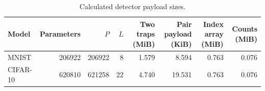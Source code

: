 \begin{table}[t]\centering\footnotesize
\caption{Calculated detector payload sizes.}\label{tab:payload}
\begin{tabular}{lrrrrrrr}\toprule
Model & Parameters & $P$ & $L$ & Two traps (MiB) & Pair payload (KiB) & Index array (MiB) & Counts (MiB) \\ \midrule
MNIST & 206922 & 206922 & 8 & 1.579 & 8.594 & 0.763 & 0.076 \\
CIFAR-10 & 620810 & 621258 & 22 & 4.740 & 19.531 & 0.763 & 0.076 \\
\bottomrule\end{tabular}\end{table}
